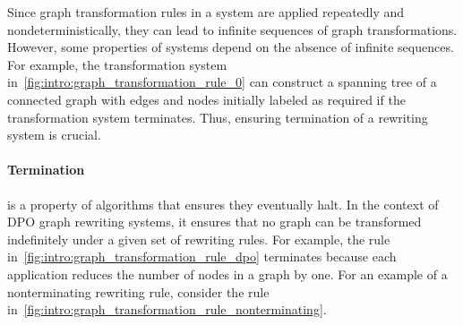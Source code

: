 Since graph transformation rules in a system are applied repeatedly and nondeterministically, they can lead to infinite sequences of graph transformations. However, some properties of systems depend on the absence of infinite sequences. For example, the transformation system in~\autoref{fig:intro:graph_transformation_rule_0} can construct a spanning tree of a connected graph with edges and nodes initially labeled as required if the transformation system terminates. Thus, ensuring termination of a rewriting system is crucial.

\paragraph{Termination} is a property of algorithms that ensures they eventually halt. In the context of DPO graph rewriting systems, it ensures that no graph can be transformed indefinitely under a given set of rewriting rules. 
For example, the rule in~\autoref{fig:intro:graph_transformation_rule_dpo} terminates because each application reduces the number of nodes in a graph by one. For an example of a nonterminating rewriting rule, consider the rule in~\autoref{fig:intro:graph_transformation_rule_nonterminating}. 
